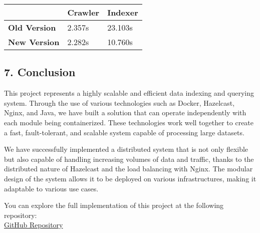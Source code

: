 \begin{longtable}[]{@{}lll@{}}
\toprule
& Crawler & Indexer \\
\midrule
\endhead
\textbf{Old Version} & 2.357s & 23.103s \\
\textbf{New Version} & 2.282s & 10.760s \\
\bottomrule
\end{longtable}

\hypertarget{conclusion}{%
\subsection{7. Conclusion}\label{conclusion}}

This project represents a highly scalable and efficient data indexing
and querying system. Through the use of various technologies such as
Docker, Hazelcast, Nginx, and Java, we have built a solution that can
operate independently with each module being containerized. These
technologies work well together to create a fast, fault-tolerant, and
scalable system capable of processing large datasets.

We have successfully implemented a distributed system that is not only
flexible but also capable of handling increasing volumes of data and
traffic, thanks to the distributed nature of Hazelcast and the load
balancing with Nginx. The modular design of the system allows it to be
deployed on various infrastructures, making it adaptable to various use
cases.

You can explore the full implementation of this project at the following
repository:\\
\href{https://github.com/KacperMrzyglocki/JavaSearchEngine1.0}{GitHub
Repository}
